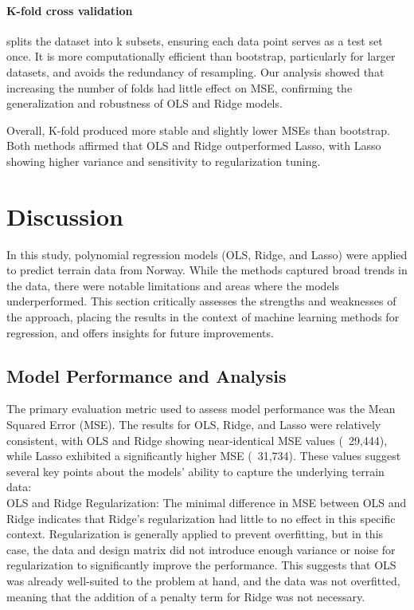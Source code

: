 \documentclass{article}
\begin{document}
\begin{enumerate}
\paragraph{K-fold cross validation}
splits the dataset into k subsets, ensuring each data point serves as a test set once. It is more computationally efficient than bootstrap, particularly for larger datasets, and avoids the redundancy of resampling. Our analysis showed that increasing the number of folds had little effect on MSE, confirming the generalization and robustness of OLS and Ridge models.
\newline\newline

Overall, K-fold produced more stable and slightly lower MSEs than bootstrap. Both methods affirmed that OLS and Ridge outperformed Lasso, with Lasso showing higher variance and sensitivity to regularization tuning.

\section{Discussion}

In this study, polynomial regression models (OLS, Ridge, and Lasso) were applied to predict terrain data from Norway. While the methods captured broad trends in the data, there were notable limitations and areas where the models underperformed. This section critically assesses the strengths and weaknesses of the approach, placing the results in the context of machine learning methods for regression, and offers insights for future improvements.

\subsection{Model Performance and Analysis}

The primary evaluation metric used to assess model performance was the Mean Squared Error (MSE). The results for OLS, Ridge, and Lasso were relatively consistent, with OLS and Ridge showing near-identical MSE values (~29,444), while Lasso exhibited a significantly higher MSE (~31,734). These values suggest several key points about the models' ability to capture the underlying terrain data:\\

OLS and Ridge Regularization: The minimal difference in MSE between OLS and Ridge indicates that Ridge's regularization had little to no effect in this specific context. Regularization is generally applied to prevent overfitting, but in this case, the data and design matrix did not introduce enough variance or noise for regularization to significantly improve the performance. This suggests that OLS was already well-suited to the problem at hand, and the data was not overfitted, meaning that the addition of a penalty term for Ridge was not necessary.\\
    

\end{enumerate}
\end{document}
